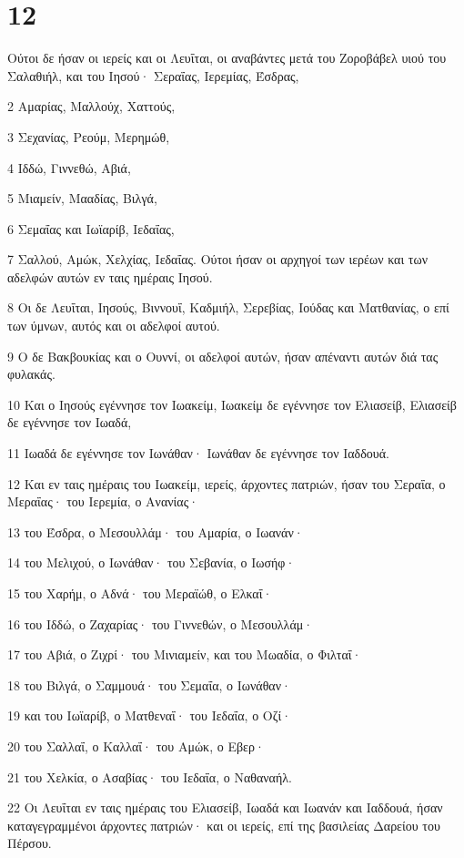\chapter{12}

\par Ούτοι δε ήσαν οι ιερείς και οι Λευΐται, οι αναβάντες μετά του Ζοροβάβελ υιού του Σαλαθιήλ, και του Ιησού· Σεραΐας, Ιερεμίας, Έσδρας,
\par 2 Αμαρίας, Μαλλούχ, Χαττούς,
\par 3 Σεχανίας, Ρεούμ, Μερημώθ,
\par 4 Ιδδώ, Γιννεθώ, Αβιά,
\par 5 Μιαμείν, Μααδίας, Βιλγά,
\par 6 Σεμαΐας και Ιωϊαρίβ, Ιεδαΐας,
\par 7 Σαλλού, Αμώκ, Χελχίας, Ιεδαΐας. Ούτοι ήσαν οι αρχηγοί των ιερέων και των αδελφών αυτών εν ταις ημέραις Ιησού.
\par 8 Οι δε Λευΐται, Ιησούς, Βιννουΐ, Καδμιήλ, Σερεβίας, Ιούδας και Ματθανίας, ο επί των ύμνων, αυτός και οι αδελφοί αυτού.
\par 9 Ο δε Βακβουκίας και ο Ουννί, οι αδελφοί αυτών, ήσαν απέναντι αυτών διά τας φυλακάς.
\par 10 Και ο Ιησούς εγέννησε τον Ιωακείμ, Ιωακείμ δε εγέννησε τον Ελιασείβ, Ελιασείβ δε εγέννησε τον Ιωαδά,
\par 11 Ιωαδά δε εγέννησε τον Ιωνάθαν· Ιωνάθαν δε εγέννησε τον Ιαδδουά.
\par 12 Και εν ταις ημέραις του Ιωακείμ, ιερείς, άρχοντες πατριών, ήσαν του Σεραΐα, ο Μεραΐας· του Ιερεμία, ο Ανανίας·
\par 13 του Έσδρα, ο Μεσουλλάμ· του Αμαρία, ο Ιωανάν·
\par 14 του Μελιχού, ο Ιωνάθαν· του Σεβανία, ο Ιωσήφ·
\par 15 του Χαρήμ, ο Αδνά· του Μεραϊώθ, ο Ελκαΐ·
\par 16 του Ιδδώ, ο Ζαχαρίας· του Γιννεθών, ο Μεσουλλάμ·
\par 17 του Αβιά, ο Ζιχρί· του Μινιαμείν, και του Μωαδία, ο Φιλταΐ·
\par 18 του Βιλγά, ο Σαμμουά· του Σεμαΐα, ο Ιωνάθαν·
\par 19 και του Ιωϊαρίβ, ο Ματθεναΐ· του Ιεδαΐα, ο Οζί·
\par 20 του Σαλλαΐ, ο Καλλαΐ· του Αμώκ, ο Εβερ·
\par 21 του Χελκία, ο Ασαβίας· του Ιεδαΐα, ο Ναθαναήλ.
\par 22 Οι Λευΐται εν ταις ημέραις του Ελιασείβ, Ιωαδά και Ιωανάν και Ιαδδουά, ήσαν καταγεγραμμένοι άρχοντες πατριών· και οι ιερείς, επί της βασιλείας Δαρείου του Πέρσου.
